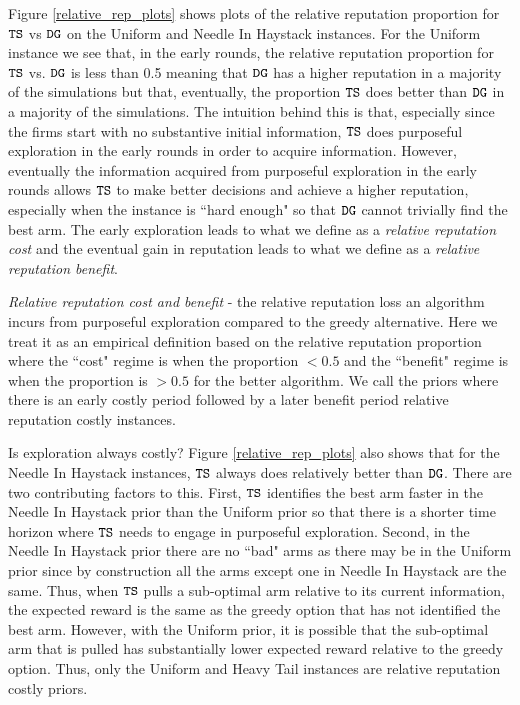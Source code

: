 \documentclass[../competing_bandits.tex]{subfiles}
\begin{document}
Figure \ref{relative_rep_plots} shows plots of the relative reputation proportion for $\mathtt{TS}$ vs $\mathtt{DG}$ on the Uniform and Needle In Haystack instances. For the Uniform instance we see that, in the early rounds, the relative reputation proportion for $\mathtt{TS}$  vs. $\mathtt{DG}$ is less than 0.5 meaning that $\mathtt{DG}$ has a higher reputation in a majority of the simulations  but that, eventually, the proportion $\mathtt{TS}$ does better than $\mathtt{DG}$ in a majority of the simulations. The intuition behind this is that, especially since the firms start with no substantive initial information, $\mathtt{TS}$ does purposeful exploration in the early rounds in order to acquire information. However, eventually the information acquired from purposeful exploration in the early rounds allows $\mathtt{TS}$ to make better decisions and achieve a higher reputation, especially when the instance is ``hard enough" so that $\mathtt{DG}$ cannot trivially find the best arm. The early exploration leads to what we define as a \textit{relative reputation cost} and the eventual gain in reputation leads to what we define as a \textit{relative reputation benefit}.

\begin{definition}
\textit{Relative reputation cost and benefit} - the relative reputation loss an algorithm incurs from purposeful exploration compared to the greedy alternative. Here we treat it as an empirical definition based on the relative reputation proportion where the ``cost" regime is when the proportion $< 0.5$ and the ``benefit" regime is when the proportion is $> 0.5$ for the better algorithm. We call the priors where there is an early costly period followed by a later benefit period relative reputation costly instances.
\end{definition}

Is exploration always costly? Figure \ref{relative_rep_plots} also shows that for the Needle In Haystack instances, $\mathtt{TS}$ always does relatively better than $\mathtt{DG}$. There are two contributing factors to this. First, $\mathtt{TS}$ identifies the best arm faster in the Needle In Haystack prior than the Uniform prior so that there is a shorter time horizon where $\mathtt{TS}$ needs to engage in purposeful exploration. Second, in the Needle In Haystack prior there are no ``bad" arms as there may be in the Uniform prior since by construction all the arms except one in Needle In Haystack are the same. Thus, when $\mathtt{TS}$ pulls a sub-optimal arm relative to its current information, the expected reward is the same as the greedy option that has not identified the best arm. However, with the Uniform prior, it is possible that the sub-optimal arm that is pulled has substantially lower expected reward relative to the greedy option. Thus, only the Uniform and Heavy Tail instances are relative reputation costly priors.
\end{document}
